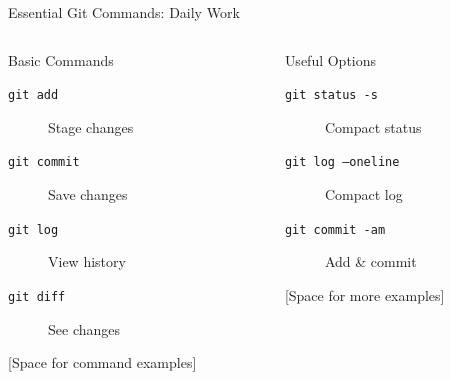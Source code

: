 \documentclass[aspectratio=169]{beamer}
\begin{document}
\begin{frame}{Essential Git Commands: Daily Work}
  \begin{columns}
    \begin{column}{0.48\textwidth}
      \begin{block}{Basic Commands}
        \begin{description}
          \item[\texttt{git add}] Stage changes
          \item[\texttt{git commit}] Save changes
          \item[\texttt{git log}] View history
          \item[\texttt{git diff}] See changes
        \end{description}
      \end{block}
      
      \vspace{1em}
      \begin{center}
        [Space for command examples]
      \end{center}
    \end{column}
    
    \begin{column}{0.48\textwidth}
      \begin{block}{Useful Options}
        \begin{description}
          \item[\texttt{git status -s}] Compact status
          \item[\texttt{git log --oneline}] Compact log
          \item[\texttt{git commit -am}] Add \& commit
        \end{description}
      \end{block}
      
      \vspace{1em}
      \begin{center}
        [Space for more examples]
      \end{center}
    \end{column}
  \end{columns}
\end{frame}
\end{document}
